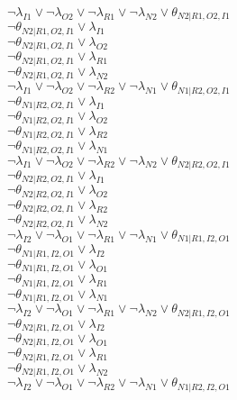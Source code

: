 $\neg\lambda_{I1} \vee \neg\lambda_{O2} \vee \neg\lambda_{R1} \vee \neg\lambda_{N2} \vee \theta_{N2|R1,O2,I1}$\\
$\neg\theta_{N2|R1,O2,I1} \vee \lambda_{I1}$\\
$\neg\theta_{N2|R1,O2,I1} \vee \lambda_{O2}$\\
$\neg\theta_{N2|R1,O2,I1} \vee \lambda_{R1}$\\
$\neg\theta_{N2|R1,O2,I1} \vee \lambda_{N2}$\\
$\neg\lambda_{I1} \vee \neg\lambda_{O2} \vee \neg\lambda_{R2} \vee \neg\lambda_{N1} \vee \theta_{N1|R2,O2,I1}$\\
$\neg\theta_{N1|R2,O2,I1} \vee \lambda_{I1}$\\
$\neg\theta_{N1|R2,O2,I1} \vee \lambda_{O2}$\\
$\neg\theta_{N1|R2,O2,I1} \vee \lambda_{R2}$\\
$\neg\theta_{N1|R2,O2,I1} \vee \lambda_{N1}$\\
$\neg\lambda_{I1} \vee \neg\lambda_{O2} \vee \neg\lambda_{R2} \vee \neg\lambda_{N2} \vee \theta_{N2|R2,O2,I1}$\\
$\neg\theta_{N2|R2,O2,I1} \vee \lambda_{I1}$\\
$\neg\theta_{N2|R2,O2,I1} \vee \lambda_{O2}$\\
$\neg\theta_{N2|R2,O2,I1} \vee \lambda_{R2}$\\
$\neg\theta_{N2|R2,O2,I1} \vee \lambda_{N2}$\\
$\neg\lambda_{I2} \vee \neg\lambda_{O1} \vee \neg\lambda_{R1} \vee \neg\lambda_{N1} \vee \theta_{N1|R1,I2,O1}$\\
$\neg\theta_{N1|R1,I2,O1} \vee \lambda_{I2}$\\
$\neg\theta_{N1|R1,I2,O1} \vee \lambda_{O1}$\\
$\neg\theta_{N1|R1,I2,O1} \vee \lambda_{R1}$\\
$\neg\theta_{N1|R1,I2,O1} \vee \lambda_{N1}$\\
$\neg\lambda_{I2} \vee \neg\lambda_{O1} \vee \neg\lambda_{R1} \vee \neg\lambda_{N2} \vee \theta_{N2|R1,I2,O1}$\\
$\neg\theta_{N2|R1,I2,O1} \vee \lambda_{I2}$\\
$\neg\theta_{N2|R1,I2,O1} \vee \lambda_{O1}$\\
$\neg\theta_{N2|R1,I2,O1} \vee \lambda_{R1}$\\
$\neg\theta_{N2|R1,I2,O1} \vee \lambda_{N2}$\\
$\neg\lambda_{I2} \vee \neg\lambda_{O1} \vee \neg\lambda_{R2} \vee \neg\lambda_{N1} \vee \theta_{N1|R2,I2,O1}$\\
